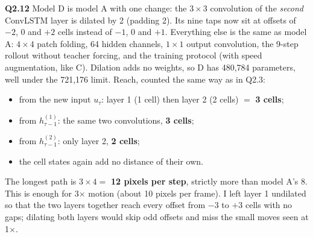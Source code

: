 \documentclass[11pt,a4paper]{article}
\begin{document}
\textbf{Q2.12} Model D is model A with one change: the $3\times3$ convolution of the \emph{second} ConvLSTM layer is dilated by 2 (padding 2). Its nine taps now sit at offsets of $-2$, 0 and $+2$ cells instead of $-1$, 0 and $+1$. Everything else is the same as model A: $4\times4$ patch folding, 64 hidden channels, $1\times1$ output convolution, the 9-step rollout without teacher forcing, and the training protocol (with speed augmentation, like C). Dilation adds no weights, so D has 480,784 parameters, well under the 721,176 limit. Reach, counted the same way as in Q2.3:
\begin{itemize}
  \item from the new input $u_\tau$: layer 1 (1 cell) then layer 2 (2 cells) $=$ \textbf{3 cells};
  \item from $h^{(1)}_{\tau-1}$: the same two convolutions, \textbf{3 cells};
  \item from $h^{(2)}_{\tau-1}$: only layer 2, \textbf{2 cells};
  \item the cell states again add no distance of their own.
\end{itemize}
The longest path is $3 \times 4 = $ \textbf{12 pixels per step}, strictly more than model A's 8. This is enough for 3$\times$ motion (about 10 pixels per frame). I left layer 1 undilated so that the two layers together reach every offset from $-3$ to $+3$ cells with no gaps; dilating both layers would skip odd offsets and miss the small moves seen at 1$\times$.
\end{document}
